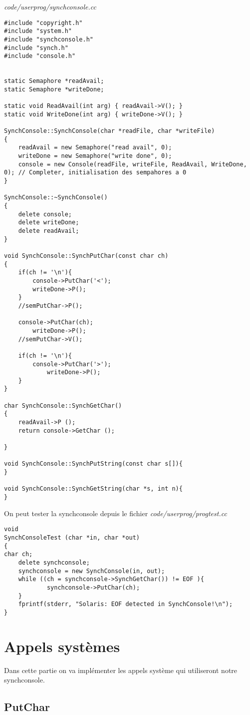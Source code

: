 \documentclass[a4paper,10pt]{article}
\begin{document}
\textit{code/userprog/synchconsole.cc}
\begin{lstlisting}
#include "copyright.h"
#include "system.h"
#include "synchconsole.h"
#include "synch.h"
#include "console.h"


static Semaphore *readAvail;
static Semaphore *writeDone;

static void ReadAvail(int arg) { readAvail->V(); }
static void WriteDone(int arg) { writeDone->V(); }

SynchConsole::SynchConsole(char *readFile, char *writeFile)
{
	readAvail = new Semaphore("read avail", 0);
	writeDone = new Semaphore("write done", 0);
	console = new Console(readFile, writeFile, ReadAvail, WriteDone, 0); // Completer, initialisation des sempahores a 0
}

SynchConsole::~SynchConsole()
{
	delete console;
	delete writeDone;
	delete readAvail;
}

void SynchConsole::SynchPutChar(const char ch)
{
	if(ch != '\n'){
		console->PutChar('<');
		writeDone->P();
	}
	//semPutChar->P();
        
	console->PutChar(ch);
        writeDone->P();
	//semPutChar->V();
        
	if(ch != '\n'){
		console->PutChar('>');
	        writeDone->P();
	}
}

char SynchConsole::SynchGetChar()
{
	readAvail->P ();
	return console->GetChar ();

}

void SynchConsole::SynchPutString(const char s[]){
}

void SynchConsole::SynchGetString(char *s, int n){
}
\end{lstlisting}

On peut tester la synchconsole depuis le fichier
\textit{code/userprog/progtest.cc}

\begin{lstlisting}
void
SynchConsoleTest (char *in, char *out)
{
char ch;
	delete synchconsole;
	synchconsole = new SynchConsole(in, out);
	while ((ch = synchconsole->SynchGetChar()) != EOF ){
			synchconsole->PutChar(ch);
	}
	fprintf(stderr, "Solaris: EOF detected in SynchConsole!\n");
}
\end{lstlisting}

\section{Appels systèmes}
Dans cette partie on va implémenter les appels système qui utiliseront notre
synchconsole.
\subsection{PutChar}
\end{document}
